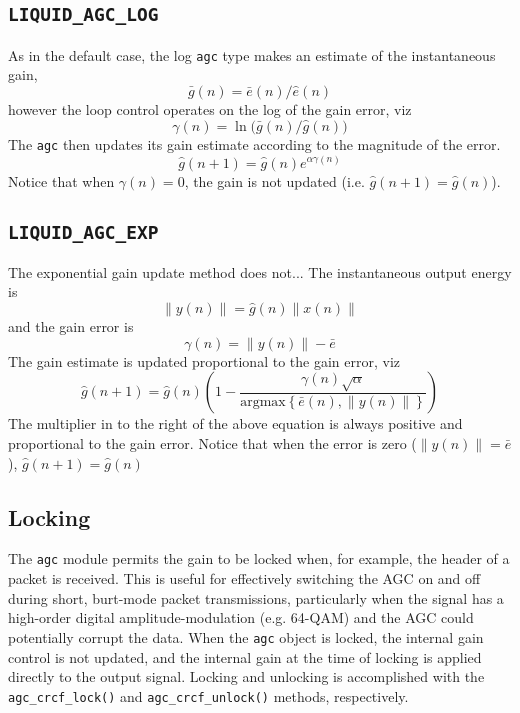 \subsection{{\tt LIQUID\_AGC\_LOG}}
As in the default case, the log {\tt agc} type makes an estimate of the
instantaneous gain,
\[
    \bar{g}(n) = \bar{e}(n) / \hat{e}(n)
\]
however the loop control operates on the log of the gain error, viz
\[
    \gamma(n) = \ln\bigl( \bar{g}(n) / \hat{g}(n) \bigr)
\]
The {\tt agc} then updates its gain estimate according to the magnitude of the
error.
\[
    \hat{g}(n+1) = \hat{g}(n) e^{ \alpha \gamma(n) }
\]
Notice that when $\gamma(n)=0$, the gain is not updated
(i.e. $\hat{g}(n+1) = \hat{g}(n)$).


\subsection{{\tt LIQUID\_AGC\_EXP}}
The exponential gain update method does not...
The instantaneous output energy is
\[  \|y(n)\| = \hat{g}(n)\|x(n)\|      \]
and the gain error is
\[
    \gamma(n) = \|y(n)\| - \bar{e}
\]
The gain estimate is updated proportional to the gain error, viz
\[
    \hat{g}(n+1) =
        \hat{g}(n) \left(1 -
         \frac{
            \gamma(n)\sqrt{\alpha}
        }{
            \text{argmax}\left\{\bar{e}(n),\|y(n)\|\right\}
        }
    \right)
\]
The multiplier in to the right of the above equation is always positive
and proportional to the gain error.
Notice that when the error is zero ($\|y(n)\| = \bar{e}$),
$\hat{g}(n+1) = \hat{g}(n)$

\subsection{Locking}
The {\tt agc} module permits the gain to be locked when, for example, the
header of a packet is received.
This is useful for effectively switching the AGC on and off during short,
burt-mode packet transmissions, particularly when the signal has a high-order
digital amplitude-modulation (e.g. 64-QAM) and the AGC could potentially
corrupt the data.
When the {\tt agc} object is locked, the internal gain control is not updated,
and the internal gain at the time of locking is applied directly to the output
signal.
%
Locking and unlocking is accomplished with the
{\tt agc\_crcf\_lock()} and
{\tt agc\_crcf\_unlock()} methods, respectively.

